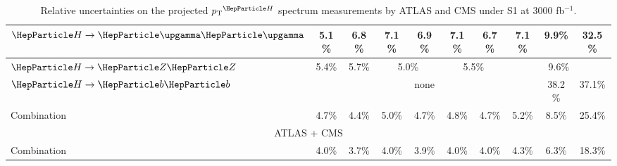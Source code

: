 \begin{table}[th]
{\begin{tabular}{l|cccccccc|c|c|c|c|c|c|c|c}
    \hline
    $\hgg$       & \multicolumn{4}{c|}{5.1\%} & \multicolumn{4}{c|}{6.8\%} & 7.1\%                      & \multicolumn{2}{c|}{6.9\%} & 7.1\%  & 6.7\%   & 7.1\%   & 9.9\%   & 32.5\%                                           \\     
    \hline
    $\hzz$       & \multicolumn{4}{c|}{5.4\%} & \multicolumn{4}{c|}{5.7\%} & \multicolumn{3}{c|}{5.0\%} & \multicolumn{2}{c|}{5.5\%} & \multicolumn{3}{c}{9.6\%}                                                               \\ 
    \hline
    $\hbb$       & \multicolumn{14}{c|}{none} & 38.2\%                     & 37.1\%                                                                                                                                            \\ 
    \hline
    Combination  & \multicolumn{4}{c|}{4.7\%} & \multicolumn{4}{c|}{4.4\%} & 5.0\%                      & \multicolumn{2}{c|}{4.7\%} & 4.8\%  & 4.7\%   & 5.2\%   & 8.5\%   & 25.4\%                                           \\
    \hline
    \hline
    \multicolumn{17}{c}{ATLAS + CMS}                                                                                                                                                                                                   \\
    \hline
    \hline
    Combination  & \multicolumn{4}{c|}{4.0\%} & \multicolumn{4}{c|}{3.7\%} & 4.0\% & \multicolumn{2}{c|}{3.9\%} & 4.0\% & 4.0\% & 4.3\% & 6.3\% & 18.3\% \\
    \hline
    \hline
  \end{tabular}
  }
  \caption{Relative uncertainties on the projected $\pTH$ spectrum measurements by ATLAS and CMS under S1 at 3000 fb$^{-1}$.}
  \label{tab:proj_pth_unc_scen1}
\end{table}



